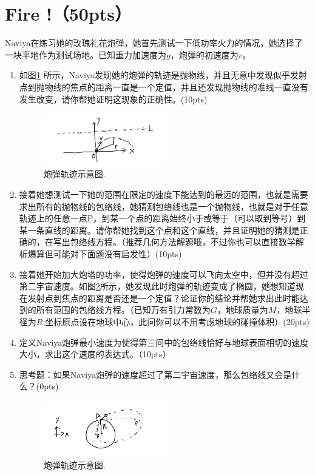 \section{Fire !（50pts）}
Naviya在练习她的玫瑰礼花炮弹，她首先测试一下低功率火力的情况，她选择了一块平地作为测试场地。已知重力加速度为\(g\)，炮弹的初速度为\(v\)。
\begin{enumerate}
	\item 如图\ref{fire1} 所示，Naviya发现她的炮弹的轨迹是抛物线，并且无意中发现似乎发射点到抛物线的焦点的距离一直是一个定值，并且还发现抛物线的准线一直没有发生改变，请你帮她证明这现象的正确性。(10pts)
	\begin{figure}[htbp]
	\centering
	\includegraphics[width=0.5\textwidth]{fire1}
	\caption{炮弹轨迹示意图.}
	\label{fire1}
	\end{figure}
	\item 接着她想测试一下她的范围在限定的速度下能达到的最远的范围，也就是需要求出所有的抛物线的包络线，她猜测包络线也是一个抛物线，也就是对于任意轨迹上的任意一点P，到某一个点的距离始终小于或等于（可以取到等号）到某一条直线的距离。请你帮她找到这个点和这个直线，并且证明她的猜测是正确的，在写出包络线方程。（推荐几何方法解题哦，不过你也可以直接数学解析爆算但可能对下面题没有启发性）(10pts)
	\item 接着她开始加大炮塔的功率，使得炮弹的速度可以飞向太空中，但并没有超过第二宇宙速度。如图\ref{fire2}所示，她发现此时炮弹的轨迹变成了椭圆，她想知道现在发射点到焦点的距离是否还是一个定值？论证你的结论并帮她求出此时能达到的所有范围的包络线方程。（已知万有引力常数为\(G\)，地球质量为\(M\)，地球半径为\(R\),坐标原点设在地球中心，此问你可以不用考虑地球的碰撞体积）(20pts)
	\item 定义Naviya炮弹最小速度为使得第三问中的包络线恰好与地球表面相切的速度大小，求出这个速度的表达式。（10pts）
	\item 思考题：如果Naviya炮弹的速度超过了第二宇宙速度，那么包络线又会是什么？(0pts)
	\begin{figure}[htbp]
	\centering
	\includegraphics[width=0.5\textwidth]{fire2}
	\caption{炮弹轨迹示意图.}
	\label{fire2}
	\end{figure}
\end{enumerate}